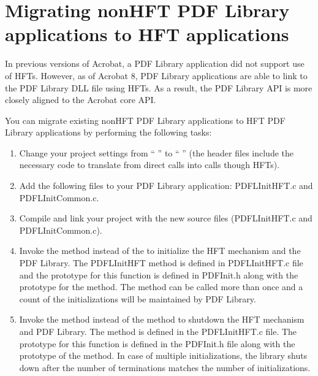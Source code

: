 \documentclass[letterpaper,12pt,english,openany,oneside]{sphinxmanual}
\begin{document}
\section{Migrating non\sphinxhyphen{}HFT PDF Library applications to HFT applications}
\label{\detokenize{Plugins_Hft:migrating-non-hft-pdf-library-applications-to-hft-applications}}
In previous versions of Acrobat, a PDF Library application did not support use of HFTs. However, as of Acrobat 8, PDF Library applications are able to link to the PDF Library DLL file using HFTs. As a result, the PDF Library API is more closely aligned to the Acrobat core API.

You can migrate existing non\sphinxhyphen{}HFT PDF Library applications to HFT PDF Library applications by performing the following tasks:
\begin{enumerate}
%
\item {} 
Change your project settings from  \sphinxcode{\sphinxupquote{=}} “ ” to  \sphinxcode{\sphinxupquote{=}} “ ” (the header files include the necessary code to translate from direct calls into calls though HFTs).

\item {} 
Add the following files to your PDF Library application: PDFLInitHFT.c and PDFLInitCommon.c.

\item {} 
Compile and link your project with the new source files (PDFLInitHFT.c and PDFLInitCommon.c).

\item {} 
Invoke the  method instead of the  to initialize the HFT mechanism and the PDF Library. The PDFLInitHFT method is defined in PDFLInitHFT.c file and the prototype for this function is defined in PDFInit.h along with the prototype for the  method. The  method can be called more than once and a count of the initializations will be maintained by PDF Library.

\item {} 
Invoke the  method instead of the  method to shutdown the HFT mechanism and PDF Library. The  method is defined in the PDFLInitHFT.c file. The prototype for this function is defined in the PDFInit.h file along with the prototype of the  method. In case of multiple initializations, the library shuts down after the number of terminations matches the number of initializations.

\end{enumerate}
\end{document}
